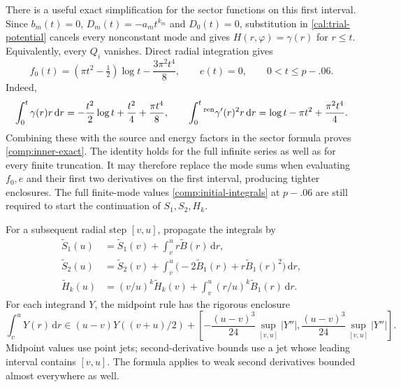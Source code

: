 There is a useful exact simplification for the sector functions on
this first interval.  Since $b_m(t)=0$, $D_m(t)=-a_mt^{k_m}$ and
$D_0(t)=0$, substitution in \eqref{cal:trial-potential} cancels every
nonconstant mode and gives $H(r,\varphi)=\gamma(r)$ for $r\le t$.
Equivalently, every $Q_i$ vanishes.  Direct radial integration gives
\begin{equation}\label{comp:inner-exact}
 f_0(t)=(\pi t^2-\tfrac12)\log t-\frac{3\pi^2t^4}{8},
 \qquad e(t)=0,\qquad 0<t\le p-.06.
\end{equation}
Indeed,
\[
 \int_0^t\gamma(r)r\,\mathrm dr
 =-\frac{t^2}{2}\log t+\frac{t^2}{4}+\frac{\pi t^4}{8},
 \qquad
 \int_0^t{}^{\rm ren}\gamma'(r)^2r\,\mathrm dr
 =\log t-\pi t^2+\frac{\pi^2t^4}{4}.
\]
Combining these with the source and energy factors in the sector
formula proves \eqref{comp:inner-exact}.  The identity holds for
the full infinite series as well as for every finite truncation.
It may therefore replace the mode sums when evaluating $f_0,e$
and their first two derivatives on the first interval, producing
tighter enclosures.  The full finite-mode values
\eqref{comp:initial-integrals} at $p-.06$ are still required to
start the continuation of $S_1,S_2,H_k$.

For a subsequent radial step $[v,u]$, propagate the integrals by
\begin{equation}\label{comp:propagation}
 \begin{split}
 \widetilde S_1(u)&=\widetilde S_1(v)+
                         \int_v^u r\widetilde B(r)\,\mathrm dr,\\
 \widetilde S_2(u)&=\widetilde S_2(v)+
             \int_v^u\bigl(-2\widetilde B_1(r)
                            +r\widetilde B_1(r)^2\bigr)\,\mathrm dr,\\
 \widetilde H_k(u)&=(v/u)^k\widetilde H_k(v)
              +\int_v^u(r/u)^k\widetilde B_1(r)\,\mathrm dr.
 \end{split}
\end{equation}
For each integrand $Y$, the midpoint rule has the rigorous enclosure
\begin{equation}\label{comp:midpoint}
 \int_v^uY(r)\,\mathrm dr
 \in (u-v)Y((v+u)/2)
   +\left[-\frac{(u-v)^3}{24}\sup_{[v,u]}|Y''|,
           \frac{(u-v)^3}{24}\sup_{[v,u]}|Y''|\right].
\end{equation}
Midpoint values use point jets; second-derivative bounds use a jet
whose leading interval contains $[v,u]$.  The formula applies to
weak second derivatives bounded almost everywhere as well.

